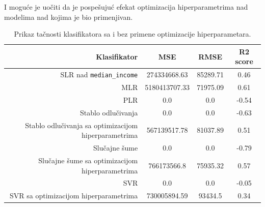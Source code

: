 \documentclass[fontsize=12bp, paper=a4]{scrarticle}
\begin{document}
I moguće je uočiti da je pospešujuć efekat optimizacija hiperparametrima nad modelima nad kojima je bio primenjivan.
\begin{table}[h]
    \centering
    \begin{tabular}{|r|c|c|c|}
    \hline
    \textbf{Klasifikator} & \textbf{MSE} & \textbf{RMSE} & \textbf{R2 score}\\
    \hline
    SLR nad \verb|median_income| & 274334668.63 & 85289.71 & 0.46\\
    \hline
    MLR & 5180413707.33 & 71975.09 & 0.61 \\
    \hline
    PLR & 0.0 & 0.0 & -0.54 \\
    \hline 
    Stablo odlučivanja & 0.0 & 0.0 & -0.63 \\
    \hline 
    Stablo odlučivanja sa optimizacijom hiperparametrima & 567139517.78 &
    81037.89 & 0.51 \\
    \hline
    Slučajne šume & 0.0 & 0.0 & -0.79 \\
    \hline
    Slučajne šume sa optimizacijom hiperparametrima & 766173566.8 & 75935.32 & 0.57 \\
    \hline
    SVR & 0.0 & 0.0 & -0.05 \\
    \hline
    SVR sa optimizacijom hiperparametrima & 730005894.59 & 93434.5 &0.34 \\
    \hline
    \end{tabular}
    \caption{Prikaz tačnosti klasifikatora sa i bez primene optimizacije hiperparametara.} 
\end{table}






\end{document}
